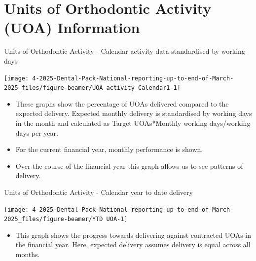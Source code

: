 \documentclass[
  8pt,
  ignorenonframetext,
  aspectratio = 169]{beamer}
\providecommand{\tightlist}{%
  \setlength{\itemsep}{0pt}\setlength{\parskip}{0pt}}
\begin{document}
\hypertarget{units-of-orthodontic-activity-uoa-information}{%
\section{Units of Orthodontic Activity (UOA)
Information}\label{units-of-orthodontic-activity-uoa-information}}

\begin{frame}{Units of Orthodontic Activity - Calendar activity data
standardised by working days}
\protect\hypertarget{units-of-orthodontic-activity---calendar-activity-data-standardised-by-working-days}{}
\begin{center}\texttt{[image: 4-2025-Dental-Pack-National-reporting-up-to-end-of-March-2025\_files/figure-beamer/UOA\_activity\_Calendar1-1]} \end{center}

\begin{itemize}
\tightlist
\item
  These graphs show the percentage of UOAs delivered compared to the
  expected delivery. Expected monthly delivery is standardised by
  working days in the month and calculated as Target UOAs*Monthly
  working days/working days per year.
\item
  For the current financial year, monthly performance is shown.
\item
  Over the course of the financial year this graph allows us to see
  patterns of delivery.
\end{itemize}
\end{frame}

\begin{frame}{Units of Orthodontic Activity - Calendar year to date
delivery}
\protect\hypertarget{units-of-orthodontic-activity---calendar-year-to-date-delivery}{}
\begin{center}\texttt{[image: 4-2025-Dental-Pack-National-reporting-up-to-end-of-March-2025\_files/figure-beamer/YTD UOA-1]} \end{center}

\begin{itemize}
\tightlist
\item
  This graph shows the progress towards delivering against contracted
  UOAs in the financial year. Here, expected delivery assumes delivery
  is equal across all months.
\end{itemize}
\end{frame}
\end{document}
